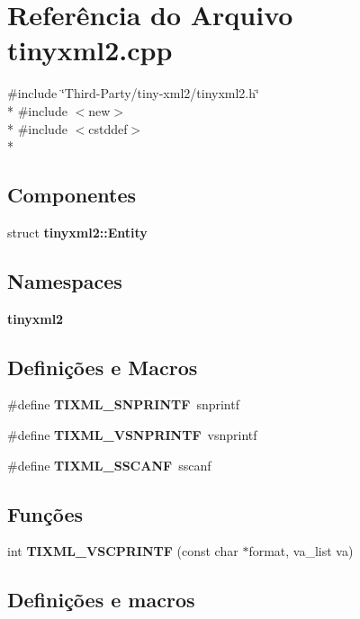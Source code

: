 \section{Referência do Arquivo tinyxml2.\+cpp}
\label{tinyxml2_8cpp}
{\ttfamily \#include \char`\"{}Third-\/\+Party/tiny-\/xml2/tinyxml2.\+h\char`\"{}}\\*
{\ttfamily \#include $<$new$>$}\\*
{\ttfamily \#include $<$cstddef$>$}\\*
\subsection*{Componentes}
\begin{DoxyCompactItemize}
\item 
struct {\bf tinyxml2\+::\+Entity}
\end{DoxyCompactItemize}
\subsection*{Namespaces}
\begin{DoxyCompactItemize}
\item 
 {\bf tinyxml2}
\end{DoxyCompactItemize}
\subsection*{Definições e Macros}
\begin{DoxyCompactItemize}
\item 
\#define {\bf T\+I\+X\+M\+L\+\_\+\+S\+N\+P\+R\+I\+N\+TF}~snprintf
\item 
\#define {\bf T\+I\+X\+M\+L\+\_\+\+V\+S\+N\+P\+R\+I\+N\+TF}~vsnprintf
\item 
\#define {\bf T\+I\+X\+M\+L\+\_\+\+S\+S\+C\+A\+NF}~sscanf
\end{DoxyCompactItemize}
\subsection*{Funções}
\begin{DoxyCompactItemize}
\item 
int {\bf T\+I\+X\+M\+L\+\_\+\+V\+S\+C\+P\+R\+I\+N\+TF} (const char $\ast$format, va\+\_\+list va)
\end{DoxyCompactItemize}


\subsection{Definições e macros}
